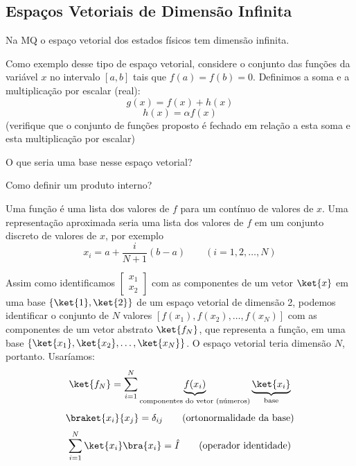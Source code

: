 \subsection*{Espaços Vetoriais de Dimensão Infinita}

Na MQ o espaço vetorial dos estados físicos tem dimensão infinita.

Como exemplo desse tipo de espaço vetorial, considere o conjunto das funções da variável $x$ no intervalo $[a,b]$ tais que $f(a) = f(b) = 0$. Definimos a soma e a multiplicação por escalar (real):
\begin{equation}
    g(x) = f(x) + h(x)
\end{equation}
\begin{equation}
    h(x) = \alpha f(x)
\end{equation}
(verifique que o conjunto de funções proposto é fechado em relação a esta soma e esta multiplicação por escalar)

O que seria uma base nesse espaço vetorial?

Como definir um produto interno?

Uma função é uma lista dos valores de $f$ para um contínuo de valores de $x$. Uma representação aproximada seria uma lista dos valores de $f$ em um conjunto discreto de valores de $x$, por exemplo
\begin{equation}
    x_i = a + \frac{i}{N+1}(b-a) \qquad (i = 1, 2, \dots, N)
\end{equation}

Assim como identificamos $\begin{bmatrix} x_1 \\ x_2 \end{bmatrix}$ com as componentes de um vetor $\ket{x}$ em uma base $\{\ket{1}, \ket{2}\}$ de um espaço vetorial de dimensão 2, podemos identificar o conjunto de $N$ valores $[f(x_1), f(x_2), \dots, f(x_N)]$ com as componentes de um vetor abstrato $\ket{f_N}$, que representa a função, em uma base $\{\ket{x_1}, \ket{x_2}, \dots, \ket{x_N}\}$. O espaço vetorial teria dimensão $N$, portanto. Usaríamos:
\begin{equation}
    \ket{f_N} = \sum_{i=1}^N \underbrace{f(x_i)}_{\text{componentes do vetor (números)}} \underbrace{\ket{x_i}}_{\text{base}}
\end{equation}
\begin{equation}
    \braket{x_i}{x_j} = \delta_{ij} \qquad \text{(ortonormalidade da base)}
\end{equation}
\begin{equation}
    \sum_{i=1}^N \ket{x_i}\bra{x_i} = \hat{I} \qquad \text{(operador identidade)}
\end{equation}

